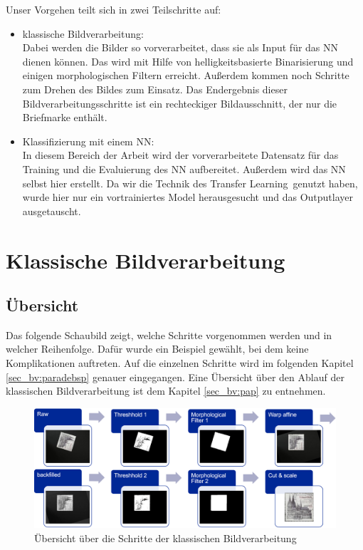 \documentclass[12pt,toc=bib,toc=listof]{scrreprt}
\begin{document}
Unser Vorgehen teilt sich in zwei Teilschritte auf:
\begin{itemize}
\item klassische Bildverarbeitung:\\ 
Dabei werden die Bilder so vorverarbeitet, dass sie als Input für das NN dienen können. Das wird mit Hilfe von helligkeitsbasierte Binarisierung und einigen morphologischen Filtern erreicht. Außerdem kommen noch Schritte zum Drehen des Bildes zum Einsatz. Das Endergebnis dieser Bildverarbeitungsschritte ist ein rechteckiger Bildausschnitt, der nur die Briefmarke enthält.

\item Klassifizierung mit einem NN:\\
In diesem Bereich der Arbeit wird der vorverarbeitete Datensatz für das Training und die Evaluierung des NN aufbereitet. Außerdem wird das NN selbst hier erstellt. Da wir die Technik des \dq Transfer Learning\dq\ genutzt haben, wurde hier nur ein vortrainiertes Model herausgesucht und das Outputlayer ausgetauscht.

\end{itemize}



\chapter{Klassische Bildverarbeitung} %
\label{sec:klass_bv}

\section{Übersicht}
\label{sec_bv:übersicht}
Das folgende Schaubild zeigt, welche Schritte vorgenommen werden und in welcher Reihenfolge. Dafür wurde ein Beispiel gewählt, bei dem keine Komplikationen auftreten. Auf die einzelnen Schritte wird im folgenden Kapitel \ref{sec_bv:paradebsp} genauer eingegangen. Eine Übersicht über den Ablauf der klassischen Bildverarbeitung ist dem Kapitel \ref{sec_bv:pap} zu entnehmen.

\begin{figure}[h]
\includegraphics[width=\textwidth]{./bilder/bv_overview.png}
\caption{Übersicht über die Schritte der klassischen Bildverarbeitung}
\label{fig:bv_overview}
\end{figure}
\end{document}
